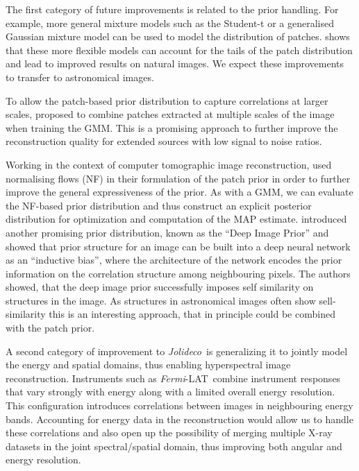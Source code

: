 \documentclass[twocolumn, linenumbers]{aastex631}
\newcommand{\fermi}{\textit{Fermi}-LAT~}
\newcommand{\jolideco}{\textit{Jolideco}~}
\newcommand{\xray}{X-ray\xspace}
\begin{document}
    The first category of future improvements is related to the prior handling. For example, more general mixture models such as the Student-t or a generalised Gaussian mixture model can be used to model the distribution of patches. \citet{VanDenOord2014} shows that these more flexible models can account for the tails of the patch distribution and lead to improved results on natural images. We expect these improvements to transfer to astronomical images.

    
    To allow the patch-based prior distribution to capture correlations at larger scales,
    \cite{Papyan2015} proposed to combine patches extracted at multiple scales of the image when training the GMM. This is a promising approach to further improve the reconstruction quality for extended sources with low signal to noise ratios.
    
    Working in the context of computer tomographic image reconstruction, \cite{Altekrueger2022} used normalising flows (NF) in their formulation of the patch prior in order to further improve the general expressiveness of the prior. As with a GMM, we can evaluate the NF-based prior distribution and thus construct an explicit posterior distribution for optimization and computation of the MAP estimate. \citet{Ulyanov2017} introduced another promising prior distribution, known as the \enquote{Deep Image Prior} and showed that prior structure for an image can be built into a deep neural network as an \enquote{inductive bias}, where the architecture of the network encodes the prior information on the correlation structure among neighbouring pixels. The authors showed, that the deep image prior successfully imposes self similarity on structures in the image. As structures in astronomical images often show sell-similarity this is an interesting approach, that in principle could be combined with the patch prior.

    A second category of improvement to \jolideco is generalizing it to jointly model the energy and spatial domains, thus enabling hyperspectral image reconstruction. Instruments such as \fermi combine instrument responses that vary strongly with energy along with a limited overall energy resolution. This configuration introduces correlations between images in neighbouring energy bands. Accounting for energy data in the reconstruction would allow us to handle these correlations and also open up the possibility of merging multiple \xray datasets in the joint spectral/spatial domain,  thus improving both  angular and energy resolution. 
\end{document}
